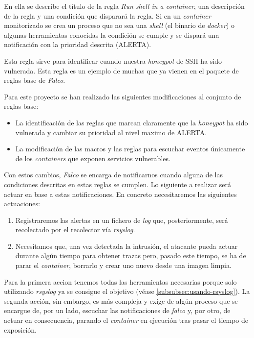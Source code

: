 En ella se describe el título de la regla \emph{Run shell in a container}, una descripción de la regla y una condición que disparará la regla.
Si en un \emph{container } monitorizado se crea un proceso que no sea una \emph{shell} (el binario de \emph{docker}) o algunas herramientas conocidas
la condición se cumple y se dispará una notificación con la prioridad descrita (ALERTA).

Esta regla sirve para identificar cuando nuestra \emph{honeypot} de SSH ha sido vulnerada. Esta regla es un ejemplo de muchas
que ya vienen en el paquete de reglas base de \emph{Falco}. 

Para este proyecto se han realizado las siguientes modificaciones al conjunto de reglas base:

\begin{itemize}
    \item La identificación de las reglas que  marcan claramente que la \emph{honeypot} ha sido vulnerada
    y cambiar su prioridad al nivel maximo de ALERTA.
    \item La modificación de las macros y las reglas para escuchar eventos únicamente de los \emph{containers} que exponen servicios vulnerables.
\end{itemize}

Con estos cambios, \emph{Falco} se encarga de notificarnos cuando alguna de las condiciones descritas en estas reglas se cumplen.
Lo siguiente a realizar será actuar en base a estas notificaciones. En concreto necesitaremos las siguientes actuaciones:

\begin{enumerate}
    \item Registraremos las alertas en un fichero de \emph{log} que, posteriormente, será recolectado por el recolector vía \emph{rsyslog}.
    \item Necesitamos que, una vez detectada la intrusión, el atacante pueda actuar durante algún tiempo para obtener trazas pero,
    pasado este tiempo, se ha de parar el \emph{container}, borrarlo y crear uno nuevo desde una imagen limpia.
\end{enumerate}

Para la primera accion tenemos todas las herramientas necesarias porque solo utilizando \emph{rsyslog} ya se consigue el objetivo (véase \ref{subsubsec:usando-rsyslog}).
La segunda acción, sin embargo, es más compleja y exige de algún proceso que se encargue de, por un lado, escuchar las notificaciones de \emph{falco} y, por otro, de 
actuar en consecuencia, parando el \emph{container} en ejecución tras pasar el tiempo de exposición. 

